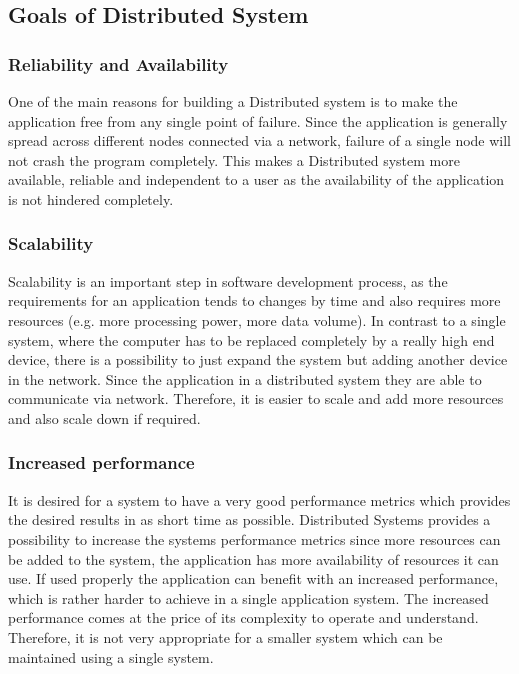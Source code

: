     \subsection{Goals of Distributed System} 
        \subsubsection{Reliability and Availability}
        One of the main reasons for building a Distributed system is to make the application free from any single point of failure.
        Since the application is generally spread across different nodes connected via a network, failure of a single node will not 
        crash the program completely. This makes a Distributed system more available, reliable and independent to a user as the availability
        of the application is not hindered completely.
        
        \subsubsection{Scalability}
        Scalability is an important step in software development process, as the requirements for an application tends to changes by time and also requires more resources
        (e.g. more processing power, more data volume). 
        In contrast to a single system, where the computer 
        has to be replaced completely by a really high end device, there is a possibility to just expand the system but adding another device in the network.
        Since the application in a distributed system they are able to communicate via network. Therefore, it is easier to scale and add more resources and 
        also scale down if required. 

        \subsubsection{Increased performance}
        It is desired for a system to have a very good performance metrics which provides the desired results in as short time as possible.
        Distributed Systems provides a possibility to increase the systems performance metrics since more resources can be added to the system,
        the application has more availability of resources it can use. If used properly the application can benefit with an increased performance, 
        which is rather harder to achieve in a single application system. The increased performance comes at the price of its complexity to operate and understand.
        Therefore, it is not very appropriate for a smaller system which can be maintained using a single system.
    
